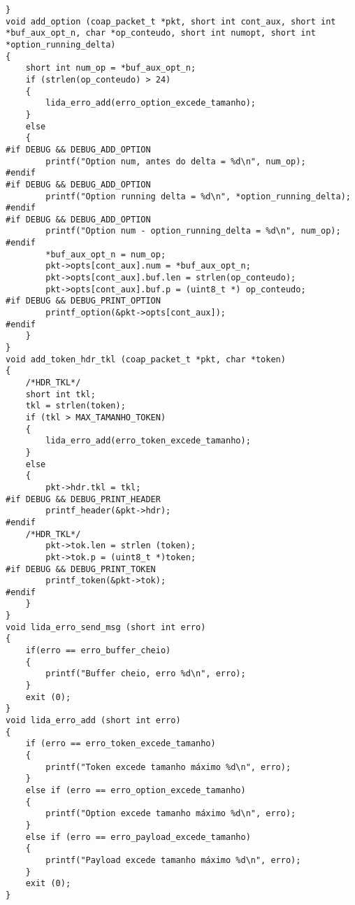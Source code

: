 \begin{lstlisting}
}
void add_option (coap_packet_t *pkt, short int cont_aux, short int *buf_aux_opt_n, char *op_conteudo, short int numopt, short int *option_running_delta)
{
	short int num_op = *buf_aux_opt_n;
	if (strlen(op_conteudo) > 24)
	{
		lida_erro_add(erro_option_excede_tamanho);
	}
	else
	{
#if DEBUG && DEBUG_ADD_OPTION
		printf("Option num, antes do delta = %d\n", num_op);
#endif
#if DEBUG && DEBUG_ADD_OPTION
		printf("Option running delta = %d\n", *option_running_delta);
#endif
#if DEBUG && DEBUG_ADD_OPTION
		printf("Option num - option_running_delta = %d\n", num_op);
#endif
		*buf_aux_opt_n = num_op;
		pkt->opts[cont_aux].num = *buf_aux_opt_n;
		pkt->opts[cont_aux].buf.len = strlen(op_conteudo);
		pkt->opts[cont_aux].buf.p = (uint8_t *) op_conteudo;
#if DEBUG && DEBUG_PRINT_OPTION
		printf_option(&pkt->opts[cont_aux]);
#endif
	}
}
void add_token_hdr_tkl (coap_packet_t *pkt, char *token)
{
	/*HDR_TKL*/
	short int tkl;
	tkl = strlen(token);
	if (tkl > MAX_TAMANHO_TOKEN)
	{
		lida_erro_add(erro_token_excede_tamanho);
	}
	else
	{
		pkt->hdr.tkl = tkl;
#if DEBUG && DEBUG_PRINT_HEADER
		printf_header(&pkt->hdr);
#endif
	/*HDR_TKL*/
		pkt->tok.len = strlen (token);
		pkt->tok.p = (uint8_t *)token;
#if DEBUG && DEBUG_PRINT_TOKEN
		printf_token(&pkt->tok);
#endif
	}
}
void lida_erro_send_msg (short int erro)
{
	if(erro == erro_buffer_cheio)
	{
		printf("Buffer cheio, erro %d\n", erro);
	}
	exit (0);
}
void lida_erro_add (short int erro)
{
	if (erro == erro_token_excede_tamanho)
	{
		printf("Token excede tamanho máximo %d\n", erro);
	}
	else if (erro == erro_option_excede_tamanho)
	{
		printf("Option excede tamanho máximo %d\n", erro);
	}
	else if (erro == erro_payload_excede_tamanho)
	{
		printf("Payload excede tamanho máximo %d\n", erro);
	}
	exit (0);
}


\end{lstlisting}
